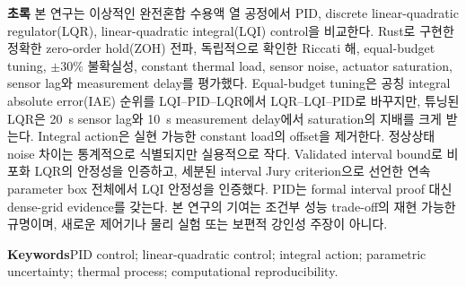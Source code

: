 \small\noindent\textbf{초록}\quad
본 연구는 이상적인 완전혼합 수용액 열 공정에서 PID, discrete linear-quadratic regulator(LQR), linear-quadratic integral(LQI) control을 비교한다. Rust로 구현한 정확한 zero-order hold(ZOH) 전파, 독립적으로 확인한 Riccati 해, equal-budget tuning, $\pm30\%$ 불확실성, constant thermal load, sensor noise, actuator saturation, sensor lag와 measurement delay를 평가했다. Equal-budget tuning은 공칭 integral absolute error(IAE) 순위를 LQI--PID--LQR에서 LQR--LQI--PID로 바꾸지만, 튜닝된 LQR은 \SI{20}{s} sensor lag와 \SI{10}{s} measurement delay에서 saturation의 지배를 크게 받는다. Integral action은 실현 가능한 constant load의 offset을 제거한다. 정상상태 noise 차이는 통계적으로 식별되지만 실용적으로 작다. Validated interval bound로 비포화 LQR의 안정성을 인증하고, 세분된 interval Jury criterion으로 선언한 연속 parameter box 전체에서 LQI 안정성을 인증했다. PID는 formal interval proof 대신 dense-grid evidence를 갖는다. 본 연구의 기여는 조건부 성능 trade-off의 재현 가능한 규명이며, 새로운 제어기나 물리 실험 또는 보편적 강인성 주장이 아니다.

\par\vspace{0.7em}\noindent\textbf{Keywords}\quad PID control; linear-quadratic control; integral action; parametric uncertainty; thermal process; computational reproducibility.
